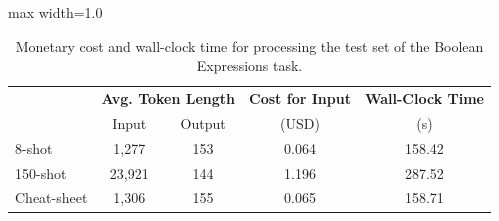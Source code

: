 \begin{table}[t]
\centering
\begin{adjustbox}{max width=1.0\textwidth}
\begin{tabular}{lcccc}
\toprule
 & \multicolumn{2}{c}{\textbf{Avg. Token Length}} & \textbf{Cost for Input} & \textbf{Wall-Clock Time} \\
  & Input & Output & (USD) & (s) \\
\midrule
8-shot & 1,277 & 153 & 0.064 & 158.42 \\
150-shot & 23,921 & 144 & 1.196 & 287.52 \\
\midrule
Cheat-sheet & 1,306 & 155 & 0.065 & 158.71 \\
\bottomrule
\end{tabular}
\end{adjustbox}
\caption{
Monetary cost and wall-clock time for processing the test set of the Boolean Expressions task.
}
\label{tab:costs}
\end{table}